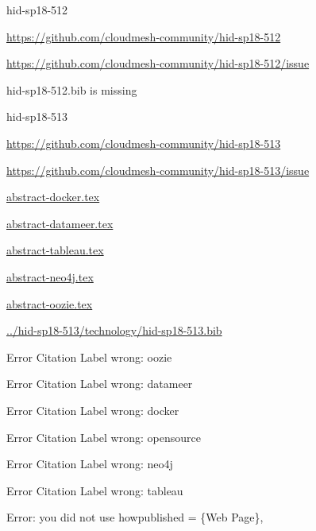 \begin{IU}

hid-sp18-512

\url{https://github.com/cloudmesh-community/hid-sp18-512}

\url{https://github.com/cloudmesh-community/hid-sp18-512/issue}

hid-sp18-512.bib is missing

\end{IU}


\begin{IU}

hid-sp18-513

\url{https://github.com/cloudmesh-community/hid-sp18-513}

\url{https://github.com/cloudmesh-community/hid-sp18-513/issue}

\href{https://github.com/cloudmesh-community/hid-sp18-513/blob/master//technology/abstract-docker.tex}{abstract-docker.tex}

\href{https://github.com/cloudmesh-community/hid-sp18-513/blob/master//technology/abstract-datameer.tex}{abstract-datameer.tex}

\href{https://github.com/cloudmesh-community/hid-sp18-513/blob/master//technology/abstract-tableau.tex}{abstract-tableau.tex}

\href{https://github.com/cloudmesh-community/hid-sp18-513/blob/master//technology/abstract-neo4j.tex}{abstract-neo4j.tex}

\href{https://github.com/cloudmesh-community/hid-sp18-513/blob/master//technology/abstract-oozie.tex}{abstract-oozie.tex}

\href{https://github.com/cloudmesh-community/hid-sp18-513/blob/master//technology/hid-sp18-513.bib}{../hid-sp18-513/technology/hid-sp18-513.bib}

 Error Citation Label wrong: oozie

 Error Citation Label wrong: datameer

 Error Citation Label wrong: docker

 Error Citation Label wrong: opensource

 Error Citation Label wrong: neo4j

 Error Citation Label wrong: tableau

Error: you did not use howpublished = \{Web Page\},

\end{IU}


